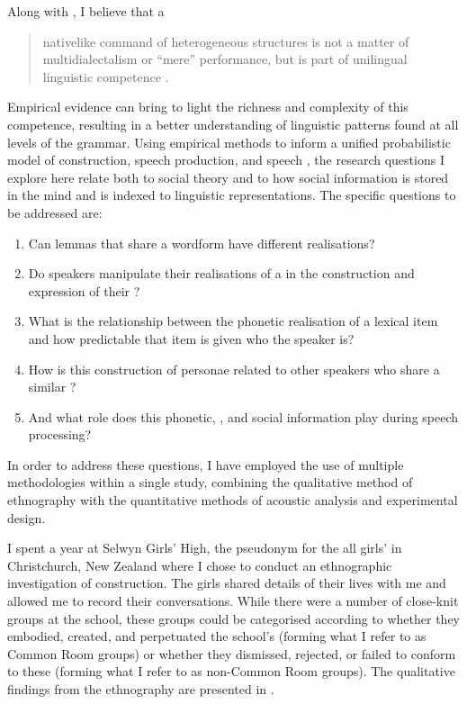 Along with \citet{weinrichlabovherzog1968}, I believe that a

\begin{quote}
	nativelike command of heterogeneous structures is not a matter of multidialectalism or ``mere'' performance, but is part of unilingual linguistic competence \citep[101]{weinrichlabovherzog1968}.
\end{quote}

\noindent Empirical evidence can bring to light the richness and complexity of this competence, resulting in a better understanding of linguistic patterns found at all levels of the grammar. Using empirical methods to inform a unified probabilistic model of  construction, speech production, and speech , the research questions I explore here relate both to social theory and to how social information is stored in the mind and is indexed to linguistic representations. The specific questions to be addressed are:

\begin{enumerate}
	\item Can lemmas that share a wordform have different realisations? 
	\item Do speakers manipulate their realisations of a  in the construction and expression of their ? 
	\item What is the relationship between the phonetic realisation of a lexical item and how predictable that item is given who the speaker is?
	\item How is this construction of personae related to other speakers who share a similar ?
	\item And what role does this phonetic, , and social information play during speech processing?  
\end{enumerate}

\noindent In order to address these questions, I have employed the use of multiple methodologies within a single study, combining the qualitative method of ethnography with the quantitative methods of acoustic analysis and experimental design. 

I spent a year at Selwyn Girls' High, the pseudonym for the all girls'  in Christchurch, New Zealand where I chose to conduct an ethnographic investigation of  construction. The girls shared details of their lives with me and allowed me to record their conversations. While there were a number of close-knit groups at the school, these groups could be categorised according to whether they embodied, created, and perpetuated the school's  (forming what I refer to as Common Room groups) or whether they dismissed, rejected, or failed to conform to these  (forming what I refer to as non-Common Room groups). The qualitative findings from the ethnography are presented in .

